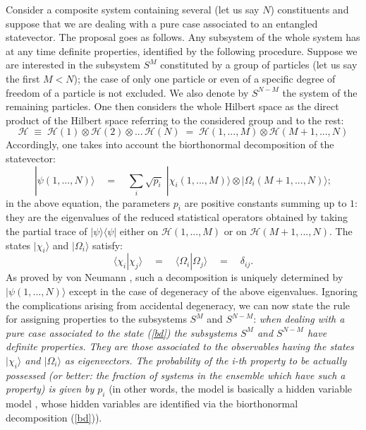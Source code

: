 \documentclass[10pt,a4paper]{article}
\begin{document}
Consider a composite system containing several (let us say $N$)
constituents and suppose that we are dealing with a pure case
associated to an entangled statevector. The proposal goes as
follows. Any subsystem of the whole system has at any time
definite properties, identified by the following procedure.
Suppose we are interested in the subsystem $S^{M}$ constituted by
a group of particles (let us say the first $M < N$); the case of
only one particle or even of a specific degree of freedom of a
particle is not excluded. We also denote by $S^{N-M}$ the system
of the remaining particles. One then considers the whole Hilbert
space as the direct product of the Hilbert space referring to the
considered group and to the rest:
\begin{equation}
{\mathcal H}\; \equiv \; {\mathcal H}(1)\otimes{\mathcal H}(2)
\otimes ...\, {\mathcal H}(N) \; = \; {\mathcal H}(1, ... , M)
\otimes {\mathcal H}(M+1, ... , N)
\end{equation}
Accordingly, one takes into account the biorthonormal
decomposition of the statevector:
\begin{equation} \label{bd}
|\psi(1, ... , N)\rangle \quad = \quad \sum_{i} \sqrt{p_{i}}\;
|\chi_{i}(1, ... , M)\rangle\otimes |\Omega_{i}(M+1, ... ,
N)\rangle;
\end{equation}
in the above equation, the parameters $p_{i}$ are positive
constants summing up to $1$: they are the eigenvalues of the
reduced statistical operators obtained by taking the partial trace
of $|\psi\rangle\langle\psi|$ either on ${\mathcal H}(1, ... , M)$
or on ${\mathcal H}(M+1, ... , N)$. The states $|\chi_{i}\rangle$
and $|\Omega_{i}\rangle$ satisfy:
\begin{equation}
\langle\chi_{i}|\chi_{j}\rangle \quad = \quad
\langle\Omega_{i}|\Omega_{j}\rangle \quad = \quad \delta_{ij}.
\end{equation}
As proved by von Neumann \cite{vn}, such a decomposition is
uniquely determined by $|\psi(1, ... , N)\rangle$ except in the
case of degeneracy of the above eigenvalues. Ignoring the
complications arising from accidental degeneracy, we can now state
the rule for assigning properties to the subsystems $S^{M}$ and
$S^{N-M}$: {\it when dealing with a pure case associated to the
state (\ref{bd}) the subsystems $S^{M}$ and $S^{N-M}$ have
definite properties. They are those associated to the observables
having the states $|\chi_{i}\rangle$ and $|\Omega_{i}\rangle$ as
eigenvectors. The probability of the i-th property to be actually
possessed (or better: the fraction of systems in the ensemble
which have such a property) is given by $p_{i}$} (in other words,
the model is basically a hidden variable model \cite{bc}, whose
hidden variables are identified via the biorthonormal
decomposition (\ref{bd})).
\end{document}
